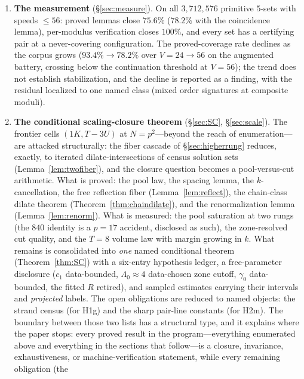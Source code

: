 \begin{enumerate}[leftmargin=1.6em,itemsep=2pt]
{  the covering obstruction is governed by a small translate-class
  structure}. The measured coverage rates of \S\ref{sec:measure} are a
  consequence of this structure, not the primary result.
\item \textbf{The measurement} (\S\ref{sec:measure}). On all
  $3{,}712{,}576$ primitive $5$-sets with speeds $\le 56$: proved lemmas
  close $75.6\%$ ($78.2\%$ with the coincidence lemma), per-modulus
  verification closes $100\%$, and every set has a certifying pair at a
  never-covering configuration. The proved-coverage rate declines as the
  corpus grows ($93.4\%\to78.2\%$ over $V=24\to56$ on the augmented
  battery, crossing below the continuation threshold at $V=56$); the trend
  does not establish stabilization, and the decline is reported as a
  finding, with the residual localized to one named class (mixed order
  signatures at composite moduli).
\item \textbf{The conditional scaling-closure theorem}
  (\S\ref{sec:SC}, \S\ref{sec:scale}). The frontier cells
  $(1K,T{-}3U)$ at $N=p^2$---beyond the reach of enumeration---are
  attacked structurally: the fiber cascade of \S\ref{sec:higherrung}
  reduces, exactly, to iterated dilate-intersections of census solution
  sets (Lemma~\ref{lem:twofiber}), and the closure question becomes a
  pool-versus-cut arithmetic. What is proved: the pool law, the spacing
  lemma, the $k$-cancellation, the free reflection fiber
  (Lemma~\ref{lem:reflect}), the chain-class dilate theorem
  (Theorem~\ref{thm:chaindilate}), and the renormalization lemma
  (Lemma~\ref{lem:renorm}). What is measured: the pool saturation at two
  rungs (the $840$ identity is a $p=17$ accident, disclosed as such),
  the zone-resolved cut quality, and the $T=8$ volume law with margin
  growing in $k$. What remains is consolidated into \emph{one} named
  conditional theorem (Theorem~\ref{thm:SC}) with a six-entry hypothesis
  ledger, a free-parameter disclosure ($c_1$ data-bounded, $\Lambda_0\approx4$
  data-chosen zone cutoff, $\gamma_0$ data-bounded, the fitted $R$ retired), and
  sampled estimates carrying their intervals and \emph{projected} labels.
  The open obligations are reduced to named objects: the strand
  census (for H1g) and the sharp pair-line constants (for H2m).
  The boundary between those two lists has a structural type, and it
  explains where the paper stops: every proved result in the
  program---everything enumerated above and everything in the sections
  that follow---is a closure, invariance, exhaustiveness, or
  machine-verification statement, while every remaining obligation (the

\end{enumerate}

